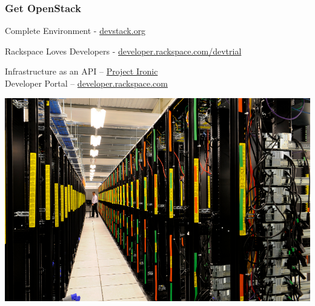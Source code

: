
\begin{frame}
\frametitle{Get OpenStack}

Complete Environment - \href{http://devstack.org/}{devstack.org}

Rackspace Loves Developers - \href{http://developer.rackspace.com/devtrial/}{developer.rackspace.com/devtrial}
 


\end{frame}

\begin{frame}
Infrastructure as an API -- \href{https://wiki.openstack.org/wiki/Baremetal}{Project Ironic} \\
Developer Portal -- \href{http://developer.rackspace.com}{developer.rackspace.com}



\end{frame}

\begin{frame}
\begin{center}
\includegraphics[width=\textwidth]{images/raxdc.jpg}
\end{center}
\end{frame}






